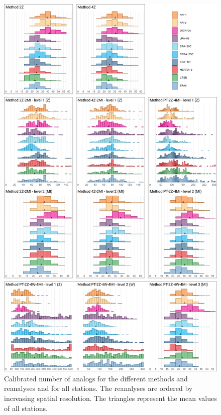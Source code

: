 \documentclass[alpha-refs]{wiley-article}
\begin{document}
\begin{figure}[btp]
	\centering
	\includegraphics[width=115mm]{figure-6.pdf}
	\caption{Calibrated number of analogs for the different methods and reanalyses and for all stations. The reanalyses are ordered by increasing spatial resolution. The triangles represent the mean values of all stations.}
	\label{fig:params-nb-analogs}
\end{figure}
\end{document}
